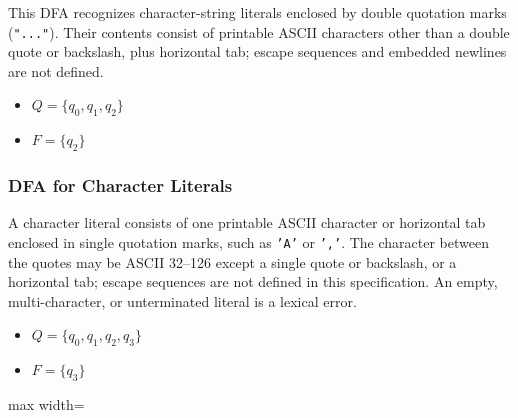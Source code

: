 \documentclass[11pt,a4paper]{article}
\newcommand{\codeinline}[1]{\texttt{#1}}
\begin{document}
This DFA recognizes character-string literals enclosed by double quotation marks (\codeinline{"..."}). Their contents consist of printable ASCII characters other than a double quote or backslash, plus horizontal tab; escape sequences and embedded newlines are not defined.

\begin{itemize}
  \item $Q=\{q_0,q_1,q_2\}$
  \item $F=\{q_2\}$
\end{itemize}

\begin{center}
\end{center}

\subsubsection{DFA for Character Literals}\label{sec:character-dfa}

A character literal consists of one printable ASCII character or horizontal tab enclosed in single quotation marks, such as \codeinline{'A'} or \codeinline{','}. The character between the quotes may be ASCII 32--126 except a single quote or backslash, or a horizontal tab; escape sequences are not defined in this specification. An empty, multi-character, or unterminated literal is a lexical error.

\begin{itemize}
  \item $Q=\{q_0,q_1,q_2,q_3\}$
  \item $F=\{q_3\}$
\end{itemize}

\begin{center}
\begin{adjustbox}{max width=\linewidth}
\end{adjustbox}
\end{center}
\end{document}
